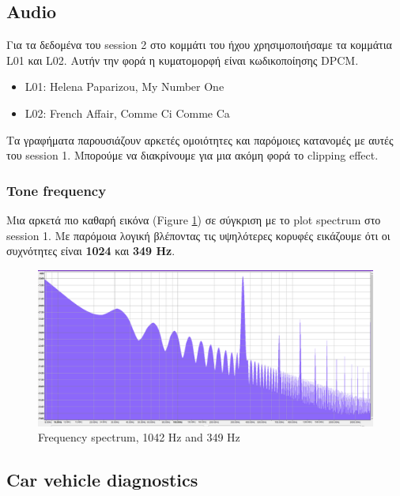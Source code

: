 \documentclass[hidelinks, 12pt, a4paper]{article}
\begin{document}
\subsection{Audio}

Για τα δεδομένα του session 2 στο κομμάτι του ήχου χρησιμοποιήσαμε τα κομμάτια L01 και L02. Αυτήν την φορά η κυματομορφή είναι κωδικοποίησης DPCM.

\begin{itemize}
    \item L01: Helena Paparizou, My Number One
    \item L02: French Affair, Comme Ci Comme Ca
\end{itemize}

Τα γραφήματα παρουσιάζουν αρκετές ομοιότητες και παρόμοιες κατανομές με αυτές του session 1. Μπορούμε να διακρίνουμε για μια ακόμη φορά το clipping effect.


\subsubsection{Tone frequency}

Μια αρκετά πιο καθαρή εικόνα (Figure \ref{spectrum2}) σε σύγκριση με το plot spectrum στο session 1. Με παρόμοια λογική βλέποντας τις υψηλότερες κορυφές εικάζουμε ότι οι συχνότητες είναι \textbf{1024} και \textbf{349 Hz}.

\begin{figure}[h!]
\centering
	\includegraphics[height=.3\textheight, width=\textwidth]{assets/session2/spectrum.png}
    \caption{Frequency spectrum, 1042 Hz and 349 Hz}
    \label{spectrum2}
\end{figure}

\subsection{Car vehicle diagnostics}
\end{document}
